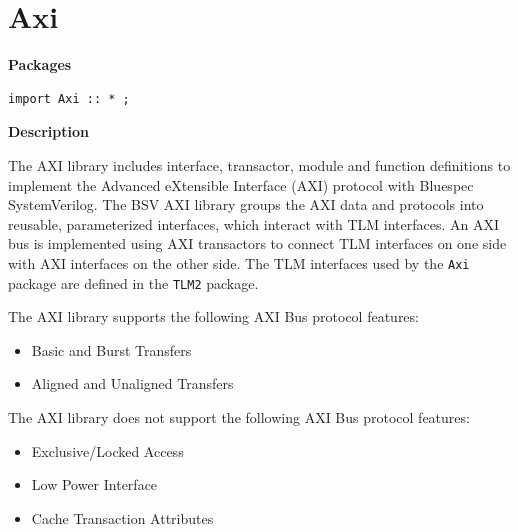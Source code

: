 \documentclass[twoside,letterpaper]{article}
\newcommand{\te}[1]{\texttt{#1}}
\begin{document}
\section{Axi}
\label{sec-AXI}

{\bf Packages}


\begin{verbatim}
import Axi :: * ;
\end{verbatim}






{\bf Description}


The AXI library includes interface, transactor, module and function
definitions to implement the Advanced eXtensible Interface (AXI)
protocol with Bluespec SystemVerilog.  The BSV AXI library groups the
AXI data and protocols into reusable, parameterized interfaces, which
interact with TLM interfaces.  An AXI bus is implemented using AXI
transactors to connect TLM interfaces on one side with AXI interfaces
on the other side.  The TLM interfaces used by the \te{Axi} package
are defined in the \te{TLM2} package. 

The AXI library supports the following AXI Bus protocol features:
\begin{itemize}
\item Basic and Burst Transfers
\item Aligned and Unaligned  Transfers
\end{itemize}

The AXI library does not support the following  AXI Bus protocol features:
\begin{itemize}
\item Exclusive/Locked Access
\item Low Power Interface
\item Cache Transaction Attributes
\end{itemize}


\end{document}
